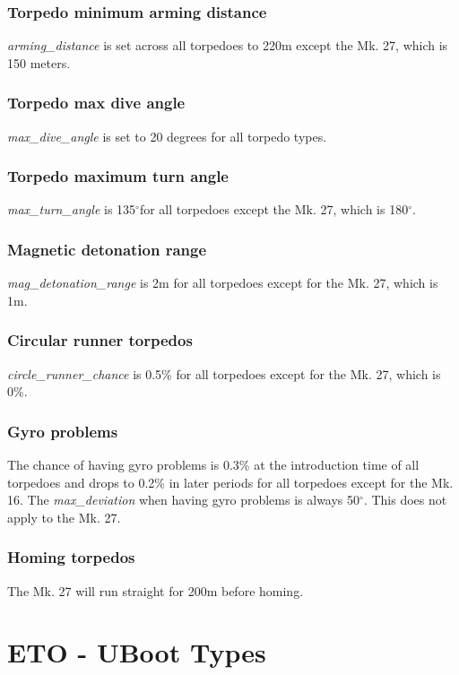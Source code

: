 \documentclass{article}
\newcommand{\degree}{$^{\circ}$}
\begin{document}
\subsubsection{Torpedo minimum arming distance}
\emph{arming\_distance} is set across all torpedoes to 220m except the Mk. 27, which is 150 meters.
\subsubsection{Torpedo max dive angle}
\emph{max\_dive\_angle} is set to 20 degrees for all torpedo types.
\subsubsection{Torpedo maximum turn angle}
\emph{max\_turn\_angle} is 135\degree for all torpedoes except the Mk. 27, which is 180\degree.
\subsubsection{Magnetic detonation range}
\emph{mag\_detonation\_range} is 2m for all torpedoes except for the Mk. 27, which is 1m.
\subsubsection{Circular runner torpedos}
\emph{circle\_runner\_chance} is 0.5\% for all torpedoes except for the Mk. 27, which is 0\%.
\subsubsection{Gyro problems}
The chance of having gyro problems is 0.3\% at the introduction time of all torpedoes and drops to 0.2\% in later periods for all torpedoes except for the Mk. 16. The \emph{max\_deviation} when having gyro problems is always 50\degree. This does not apply to the Mk. 27. 
\subsubsection{Homing torpedos}
The Mk. 27 will run straight for 200m before homing.

\section{ETO - UBoot Types}




\end{document}
